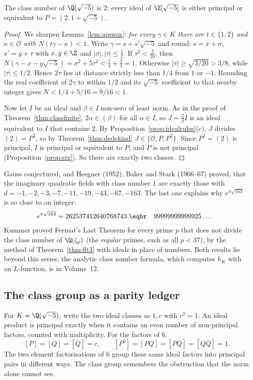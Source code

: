 \begin{theorem}\label{thm:hm5}
The class number of $\Q(\sqrt{-5})$ is $2$: every ideal of $\Z[\sqrt{-5}]$ is either principal or equivalent to $P=(2,1+\sqrt{-5})$.
\end{theorem}
\begin{proof}
We sharpen Lemma~\ref{lem:approx}: \emph{for every $\gamma\in K$ there are $t\in\{1,2\}$ and $\kappa\in\mathcal O$ with $N(t\gamma-\kappa)<1$.} Write $\gamma=s+s'\sqrt{-5}$ and round: $s=x+\sigma$, $s'=y+\tau$ with $x,y\in\Z$ and $|\sigma|,|\tau|\le\frac12$. If $\tau^2<\frac3{20}$, then $N(\gamma-x-y\sqrt{-5})=\sigma^2+5\tau^2<\frac14+\frac34=1$. Otherwise $|\tau|\ge\sqrt{3/20}>3/8$, while $|\tau|\le1/2$. Hence $2\tau$ lies at distance strictly less than $1/4$ from $1$ or $-1$. Rounding the real coefficient of $2\gamma$ to within $1/2$ and its $\sqrt{-5}$ coefficient to that nearby integer gives $N<1/4+5/16=9/16<1$.

Now let $I$ be an ideal and $\beta\in I$ non-zero of least norm. As in the proof of Theorem~\ref{thm:classfinite}, $2\alpha\in(\beta)$ for all $\alpha\in I$, so $J=\frac2\beta I$ is an ideal equivalent to $I$ that contains $2$. By Proposition~\ref{prop:idealrules}(c), $J$ divides $(2)=P^2$, so by Theorem~\ref{thm:dedekind} $J\in\{\mathcal O,P,P^2\}$. Since $P^2=(2)$ is principal, $I$ is principal or equivalent to $P$; and $P$ is not principal (Proposition~\ref{prop:six}). So there are exactly two classes.
\end{proof}

\begin{remark}
Gauss conjectured, and Heegner (1952), Baker and Stark (1966--67) proved, that the imaginary quadratic fields with class number $1$ are exactly those with $d=-1,-2,-3,-7,-11,-19,-43,-67,-163$. The last one explains why $e^{\pi\sqrt{163}}$ is so close to an integer:
\[\begin{aligned}e^{\pi\sqrt{163}}&=262537412640768743.\eqbr\quad99999999999925\ldots\end{aligned}\]
 Kummer proved Fermat's Last Theorem for every prime $p$ that does not divide the class number of $\Q(\zeta_p)$ (the \emph{regular} primes, such as all $p<37$), by the method of Theorem~\ref{thm:flt3} with ideals in place of numbers. Both results lie beyond this series; the analytic class number formula, which computes $h_K$ with an $L$-function, is in Volume~12.
\end{remark}

\subsection*{The class group as a parity ledger}
For $K=\Q(\sqrt{-5})$, write the two ideal classes as $1,c$ with $c^2=1$.
An ideal product is principal exactly when it contains an even number of
non-principal factors, counted with multiplicity. For the factors of $6$,
\[
[P]=[Q]=[\bar Q]=c,\qquad
[P^2]=[PQ]=[P\bar Q]=[Q\bar Q]=1.
\]
The two element factorisations of $6$ group these same ideal factors into
principal pairs in different ways. The class group remembers the obstruction
that the norm alone cannot see.

